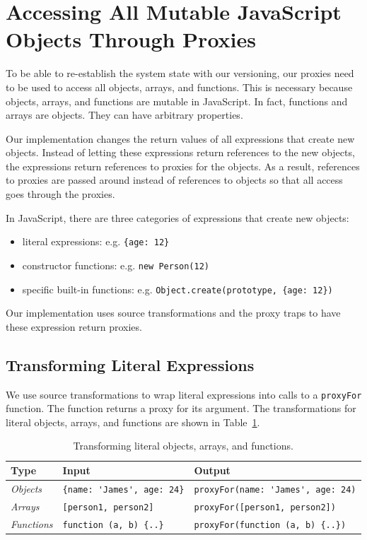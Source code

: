 \section{Accessing All Mutable JavaScript Objects Through Proxies}

To be able to re-establish the system state with our versioning, our proxies need to be used to access all objects, arrays, and functions.
This is necessary because objects, arrays, and functions are mutable in JavaScript.
In fact, functions and arrays are objects.
They can have arbitrary properties.

Our implementation changes the return values of all expressions that create new objects.
Instead of letting these expressions return references to the new objects, the expressions return references to proxies for the objects.
As a result, references to proxies are passed around instead of references to objects so that all access goes through the proxies.

In JavaScript, there are three categories of expressions that create new objects: 
\begin{itemize}
    \item literal expressions: e.g. \lstinline|{age: 12}|
    \item constructor functions: e.g. \lstinline|new Person(12)|
    \item specific built-in functions: e.g. \lstinline|Object.create(prototype, {age: 12})|
\end{itemize}

Our implementation uses source transformations and the proxy traps to have these expression return proxies.


\subsection{Transforming Literal Expressions}

We use source transformations to wrap literal expressions into calls to a \lstinline{proxyFor} function.
The function returns a proxy for its argument.
The transformations for literal objects, arrays, and functions are shown in Table~\ref{table:literalTransforms}.

\begin{table}[h]
\begin{center}
\begin{tabular}{| l | l | l |}
\hline
Type & Input & Output \\ \hline
\emph{Objects} & \lstinline|{name: 'James', age: 24}| & \lstinline|proxyFor(name: 'James', age: 24)| \\ \hline
\emph{Arrays} & \lstinline|[person1, person2]| & \lstinline|proxyFor([person1, person2])| \\ \hline
\emph{Functions} & \lstinline|function (a, b) {..}| & \lstinline|proxyFor(function (a, b) {..})| \\ \hline
\end{tabular}
\end{center}
\caption[Table caption text]{Transforming literal objects, arrays, and functions.}
\label{table:literalTransforms}
\end{table}

